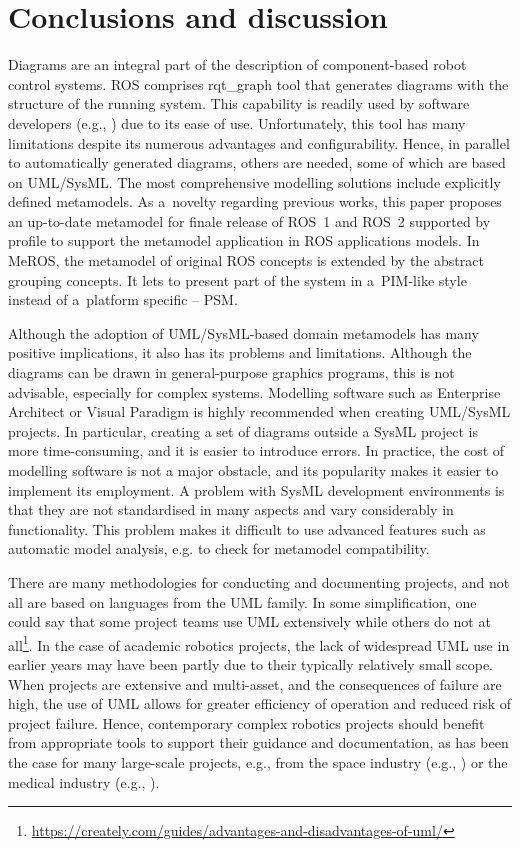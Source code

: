\documentclass{ieeeaccess}
\begin{document}
	
\section{Conclusions and discussion}
\label{sec:conslusions}

	Diagrams are an integral part of the description of component-based robot control systems. ROS comprises rqt\_graph tool that generates diagrams with the structure of the running system. This capability is readily used by software developers (e.g., \cite{thale2020ros,bisi2018development}) due to its ease of use. Unfortunately, this tool has many limitations despite its numerous advantages and configurability. Hence, in parallel to automatically generated diagrams, others are needed, some of which are based on UML/SysML. The most comprehensive modelling solutions include explicitly defined metamodels. As a~novelty regarding previous works, this paper proposes an up-to-date metamodel for finale release of ROS~1 and ROS~2 supported by profile to support the metamodel application in ROS applications models. In MeROS, the metamodel of original ROS concepts is extended by the abstract grouping concepts. It lets to present part of the system in a~PIM-like style instead of a~platform specific -- PSM.
		
	Although the adoption of UML/SysML-based domain metamodels has many positive implications, it also has its problems and limitations. Although the diagrams can be drawn in general-purpose graphics programs, this is not advisable, especially for complex systems. Modelling software such as Enterprise Architect or Visual Paradigm is highly recommended when creating UML/SysML projects.  In particular, creating a set of diagrams outside a SysML project is more time-consuming, and it is easier to introduce errors. In practice, the cost of modelling software is not a major obstacle, and its popularity makes it easier to implement its employment. A problem with SysML development environments is that they are not standardised in many aspects and vary considerably in functionality. This problem makes it difficult to use advanced features such as automatic model analysis, e.g. to check for metamodel compatibility.
	
	There are many methodologies for conducting and documenting projects, and not all are based on languages from the UML family. In some simplification, one could say that some project teams use UML extensively while others do not at all\footnote{\url{https://creately.com/guides/advantages-and-disadvantages-of-uml/}}. In the case of academic robotics projects, the lack of widespread UML use in earlier years may have been partly due to their typically relatively small scope. When projects are extensive and multi-asset, and the consequences of failure are high, the use of UML allows for greater efficiency of operation and reduced risk of project failure. Hence, contemporary complex robotics projects should benefit from appropriate tools to support their guidance and documentation, as has been the case for many large-scale projects, e.g., from the space industry (e.g., \cite{friedenthal2017architecting}) or the medical industry (e.g., \cite{BiomedicalHealthcare}).
	
\end{document}
